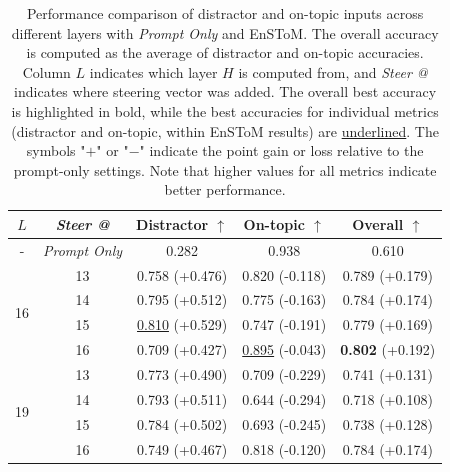 \documentclass[11pt]{article}
\begin{document}


\begin{table}[ht]
    \centering
    \begin{tabular}{ccccc}
        \toprule
        \textbf{$L$} & \textbf{\textit{Steer @}} & \textbf{Distractor} $\uparrow$ & \textbf{On-topic} $\uparrow$ & \textbf{Overall} $\uparrow$ \\
        \midrule
        -&\textit{Prompt Only} & 0.282 & 0.938 & 0.610 \\
        \midrule
        \multirow{4}{*}{16} 
        & 13 & 0.758 (+0.476) & 0.820 (-0.118) & 0.789 (+0.179) \\
        & 14 & 0.795 (+0.512) & 0.775 (-0.163) & 0.784 (+0.174) \\
        & 15 & \underline{0.810} (+0.529) & 0.747 (-0.191) & 0.779 (+0.169) \\
        & 16 & 0.709 (+0.427) & \underline{0.895} (-0.043) & \textbf{0.802} (+0.192) \\
        \midrule
        \multirow{4}{*}{19} 
        & 13 & 0.773 (+0.490) & 0.709 (-0.229) & 0.741 (+0.131) \\
        & 14 & 0.793 (+0.511) & 0.644 (-0.294) & 0.718 (+0.108) \\
        & 15 & 0.784 (+0.502) & 0.693 (-0.245) & 0.738 (+0.128) \\
        & 16 & 0.749 (+0.467) & 0.818 (-0.120) & 0.784 (+0.174) \\
        \bottomrule
    \end{tabular}
    \caption{Performance comparison of distractor and on-topic inputs across different layers with \textit{Prompt Only} and EnSToM. The overall accuracy is computed as the average of distractor and on-topic accuracies. Column $L$ indicates which layer $H$ is computed from, and \textit{Steer @} indicates where steering vector was added. The overall best accuracy is highlighted in bold, while the best accuracies for individual metrics (distractor and on-topic, within EnSToM results) are \underline{underlined}. The symbols "$+$" or "$-$" indicate the point gain or loss relative to the prompt-only settings. Note that higher values for all metrics indicate better performance.}
    \label{tab:main}
\end{table}
\end{document}
